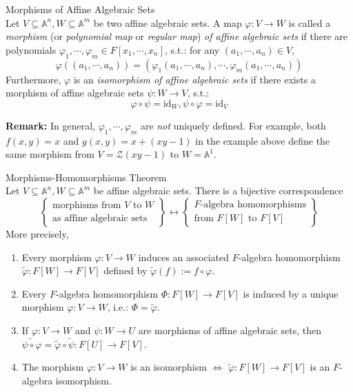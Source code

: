 \begin{definition}{Morphisms of Affine Algebraic Sets}\\
Let $V \subseteq \mathbb{A}^n, W\subseteq \mathbb{A}^m$ be two affine algebraic sets. A map $\varphi: V\to W$ is called a \textit{morphism} (or \textit{polynomial map} or \textit{regular map}) \textit{of affine algebraic sets} if there are polynomials $\varphi_1, \cdots, \varphi_m \in F[x_1 ,\cdots, x_n]$, s.t.: for any $(a_1 ,\cdots, a_n)\in V$,
$$\varphi ((a_1 ,\cdots, a_n)) = (\varphi_1 (a_1 ,\cdots, a_n), \cdots, \varphi_m(a_1 ,\cdots, a_n))$$
Furthermore, $\varphi$ is an \textit{isomorphism of affine algebraic sets} if there exists a morphism of affine algebraic sets $\psi: W\to V$, s.t.:
$$\varphi \circ \psi= \text{id}_{W} ,\psi\circ \varphi =\text{id}_V$$
\end{definition}

\noindent\textbf{Remark:} In general, $\varphi_1 ,\cdots, \varphi_m$ are \textit{not} uniquely defined. For example, both $f(x,y)=x$ and $g(x,y) =x+(xy-1)$ in the example above define the same morphism from $V= \mathcal{Z} (xy-1)$ to $W= \mathbb{A}^1$.

\begin{theorem}{Morphisms-Homomorphisms Theorem}\\
Let $V \subseteq \mathbb{A}^n, W\subseteq \mathbb{A}^m$ be affine algebraic sets. There is a bijective correspondence
\[
\left\{
\begin{matrix}
    \text{morphisms from }V \text{ to }W\\
    \text{as affine algebraic sets}
\end{matrix}
\right\} \longleftrightarrow
\left\{
\begin{matrix}
    F \text{-algebra homomorphisms}\\
    \text{from } F[W] \text{ to } F[V]
\end{matrix}
\right\}
\]
More precisely,
\begin{enumerate}
    \item Every morphism $\varphi: V \to W$ induces an associated $F$-algebra homomorphism $\tilde{\varphi}: F[W] \to F[V]$ defined by $\tilde{\varphi} (f):= f\circ \varphi$.
    \item Every $F$-algebra homomorphism $\Phi: F[W] \to F[V]$ is induced by a unique morphism $\varphi:V \to W$, i.e.: $\Phi =\tilde{\varphi}$.

    \item If $\varphi: V\to W$ and $\psi: W\to U$ are morphisms of affine algebraic sets, then $\widetilde{\psi \circ \varphi} = \widetilde{\varphi} \circ \widetilde{\psi}: F[U] \to F[V]$.

    \item The morphism $\varphi: V\to W$ is an isomorphism $\Leftrightarrow$ $\widetilde{\varphi}: F[W] \to F[V]$ is an $F$-algebra isomorphism.
\end{enumerate}
\end{theorem}

